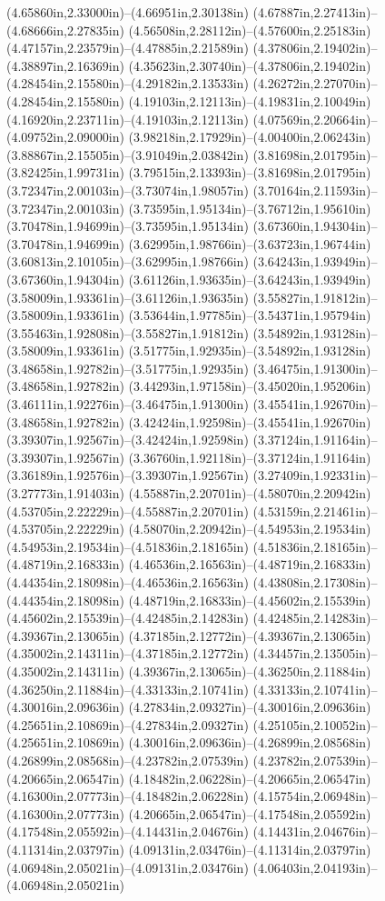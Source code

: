 (4.65860in,2.33000in)--(4.66951in,2.30138in) (4.67887in,2.27413in)--(4.68666in,2.27835in) (4.56508in,2.28112in)--(4.57600in,2.25183in) (4.47157in,2.23579in)--(4.47885in,2.21589in) (4.37806in,2.19402in)--(4.38897in,2.16369in) (4.35623in,2.30740in)--(4.37806in,2.19402in) (4.28454in,2.15580in)--(4.29182in,2.13533in) (4.26272in,2.27070in)--(4.28454in,2.15580in) (4.19103in,2.12113in)--(4.19831in,2.10049in) (4.16920in,2.23711in)--(4.19103in,2.12113in) (4.07569in,2.20664in)--(4.09752in,2.09000in) (3.98218in,2.17929in)--(4.00400in,2.06243in) (3.88867in,2.15505in)--(3.91049in,2.03842in) (3.81698in,2.01795in)--(3.82425in,1.99731in) (3.79515in,2.13393in)--(3.81698in,2.01795in) (3.72347in,2.00103in)--(3.73074in,1.98057in) (3.70164in,2.11593in)--(3.72347in,2.00103in) (3.73595in,1.95134in)--(3.76712in,1.95610in) (3.70478in,1.94699in)--(3.73595in,1.95134in) (3.67360in,1.94304in)--(3.70478in,1.94699in) (3.62995in,1.98766in)--(3.63723in,1.96744in) (3.60813in,2.10105in)--(3.62995in,1.98766in) (3.64243in,1.93949in)--(3.67360in,1.94304in) (3.61126in,1.93635in)--(3.64243in,1.93949in) (3.58009in,1.93361in)--(3.61126in,1.93635in) (3.55827in,1.91812in)--(3.58009in,1.93361in) (3.53644in,1.97785in)--(3.54371in,1.95794in) (3.55463in,1.92808in)--(3.55827in,1.91812in) (3.54892in,1.93128in)--(3.58009in,1.93361in) (3.51775in,1.92935in)--(3.54892in,1.93128in) (3.48658in,1.92782in)--(3.51775in,1.92935in) (3.46475in,1.91300in)--(3.48658in,1.92782in) (3.44293in,1.97158in)--(3.45020in,1.95206in) (3.46111in,1.92276in)--(3.46475in,1.91300in) (3.45541in,1.92670in)--(3.48658in,1.92782in) (3.42424in,1.92598in)--(3.45541in,1.92670in) (3.39307in,1.92567in)--(3.42424in,1.92598in) (3.37124in,1.91164in)--(3.39307in,1.92567in) (3.36760in,1.92118in)--(3.37124in,1.91164in) (3.36189in,1.92576in)--(3.39307in,1.92567in) (3.27409in,1.92331in)--(3.27773in,1.91403in) (4.55887in,2.20701in)--(4.58070in,2.20942in) (4.53705in,2.22229in)--(4.55887in,2.20701in) (4.53159in,2.21461in)--(4.53705in,2.22229in) (4.58070in,2.20942in)--(4.54953in,2.19534in) (4.54953in,2.19534in)--(4.51836in,2.18165in) (4.51836in,2.18165in)--(4.48719in,2.16833in) (4.46536in,2.16563in)--(4.48719in,2.16833in) (4.44354in,2.18098in)--(4.46536in,2.16563in) (4.43808in,2.17308in)--(4.44354in,2.18098in) (4.48719in,2.16833in)--(4.45602in,2.15539in) (4.45602in,2.15539in)--(4.42485in,2.14283in) (4.42485in,2.14283in)--(4.39367in,2.13065in) (4.37185in,2.12772in)--(4.39367in,2.13065in) (4.35002in,2.14311in)--(4.37185in,2.12772in) (4.34457in,2.13505in)--(4.35002in,2.14311in) (4.39367in,2.13065in)--(4.36250in,2.11884in) (4.36250in,2.11884in)--(4.33133in,2.10741in) (4.33133in,2.10741in)--(4.30016in,2.09636in) (4.27834in,2.09327in)--(4.30016in,2.09636in) (4.25651in,2.10869in)--(4.27834in,2.09327in) (4.25105in,2.10052in)--(4.25651in,2.10869in) (4.30016in,2.09636in)--(4.26899in,2.08568in) (4.26899in,2.08568in)--(4.23782in,2.07539in) (4.23782in,2.07539in)--(4.20665in,2.06547in) (4.18482in,2.06228in)--(4.20665in,2.06547in) (4.16300in,2.07773in)--(4.18482in,2.06228in) (4.15754in,2.06948in)--(4.16300in,2.07773in) (4.20665in,2.06547in)--(4.17548in,2.05592in) (4.17548in,2.05592in)--(4.14431in,2.04676in) (4.14431in,2.04676in)--(4.11314in,2.03797in) (4.09131in,2.03476in)--(4.11314in,2.03797in) (4.06948in,2.05021in)--(4.09131in,2.03476in) (4.06403in,2.04193in)--(4.06948in,2.05021in) 